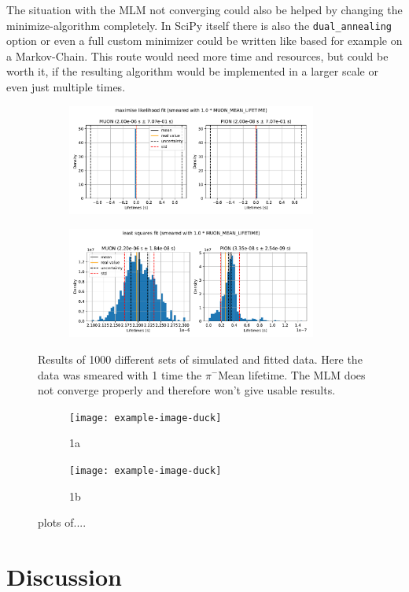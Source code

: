 \documentclass[11pt, a4paper, oneside]{book}
\newcommand\DoublePlotwidth{0.9}
\newcommand{\pion}{$\pi^{-}$}
\begin{document}
The situation with the MLM not converging could also be helped by changing the minimize-algorithm completely. In SciPy itself there is also the \lstinline{dual_annealing} option or even a full custom minimizer could be written like based for example on a Markov-Chain. This route would need more time and resources, but could be worth it, if the resulting algorithm would be implemented in a larger scale or even just multiple times.

\begin{figure}[h]
\begin{subfigure}{\textwidth}
  \centering
  \includegraphics[width=\DoublePlotwidth\textwidth]{images/4b_hist_2_likelihood.pdf}
\end{subfigure}

\begin{subfigure}{\textwidth}
  \centering
  \includegraphics[width=\DoublePlotwidth\textwidth]{images/4b_hist_2_squares.pdf}
\end{subfigure}
\caption{Results of 1000 different sets of simulated and fitted data. Here the data was smeared with 1 time the \pion Mean lifetime. The MLM does not converge properly and therefore won't give usable results.}
\label{fig:results_smeared_2}
\end{figure}

\begin{figure}[h]
\begin{subfigure}{\textwidth}
  \centering
  \texttt{[image: example-image-duck]}
  \caption{1a}
\end{subfigure}

\begin{subfigure}{\textwidth}
  \centering
  \texttt{[image: example-image-duck]}
  \caption{1b}
\end{subfigure}
\caption{plots of....}
\label{fig:fig}
\end{figure}

\chapter{Discussion}


\end{document}
